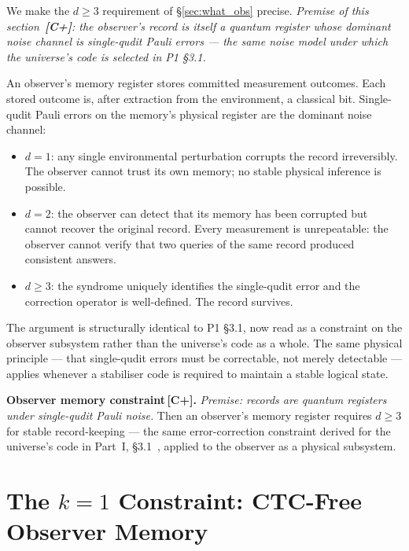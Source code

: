 \documentclass[11pt,a4paper]{article}
\newcommand{\Cpmark}{\textcolor{blue!70!black}{\textbf{[C+]}}}
\begin{document}
We make the $d\geq3$ requirement of \S\ref{sec:what_obs} precise.
\emph{Premise of this section~\Cpmark: the observer's record is itself a
quantum register whose dominant noise channel is single-qudit Pauli
errors --- the same noise model under which the universe's code is selected
in P1 \S3.1.}

An observer's memory register stores committed measurement outcomes. Each stored outcome is, after extraction from the environment, a classical bit. Single-qudit Pauli errors on the memory's physical register are the dominant noise channel:
\begin{itemize}\setlength\itemsep{2pt}
  \item $d=1$: any single environmental perturbation corrupts the record irreversibly. The observer cannot trust its own memory; no stable physical inference is possible.
  \item $d=2$: the observer can detect that its memory has been corrupted but cannot recover the original record. Every measurement is unrepeatable: the observer cannot verify that two queries of the same record produced consistent answers.
  \item $d\geq3$: the syndrome uniquely identifies the single-qudit error and the correction operator is well-defined. The record survives.
\end{itemize}

The argument is structurally identical to P1 \S3.1, now read as a constraint on the observer subsystem rather than the universe's code as a whole. The same physical principle --- that single-qudit errors must be correctable, not merely detectable --- applies whenever a stabiliser code is required to maintain a stable logical state.

\begin{mdframed}[backgroundcolor=Rbg,linecolor=Rcolor,linewidth=1.5pt]
\textbf{Observer memory constraint\,\Cpmark.}\quad
\emph{Premise: records are quantum registers under single-qudit Pauli noise.} Then an observer's memory register requires $d\geq3$ for stable record-keeping --- the same error-correction constraint derived for the universe's code in Part~I, \S3.1~\cite{Hubka2026QSD}, applied to the observer as a physical subsystem.
\end{mdframed}

\section{The $k=1$ Constraint: CTC-Free Observer Memory}
\label{sec:k1}
\end{document}
